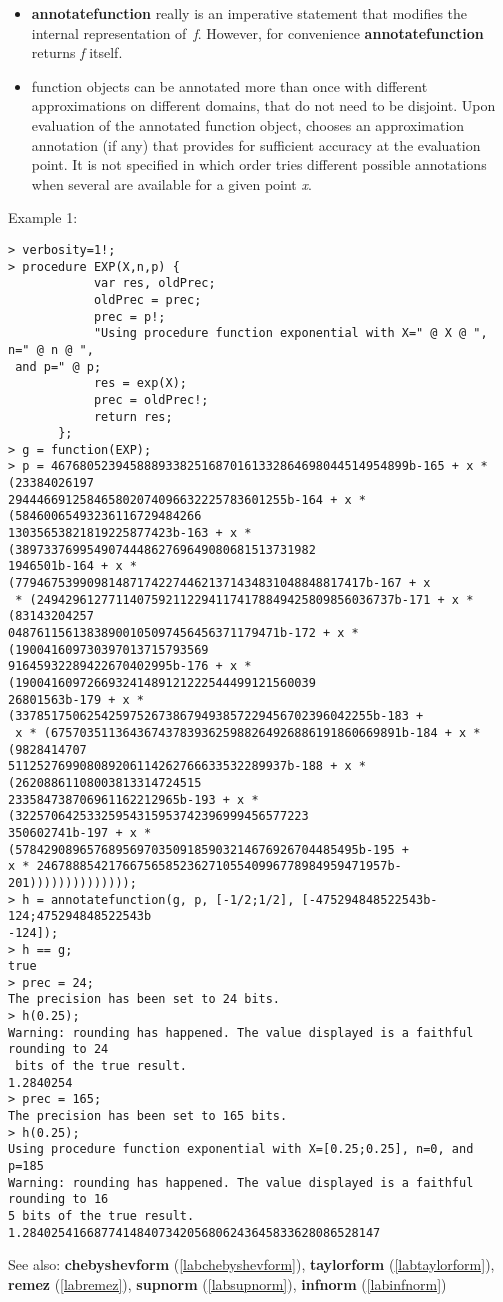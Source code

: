 \begin{itemize}
\item \textbf{annotatefunction} really is an imperative statement that modifies the
   internal representation of~\emph{f}. However, for convenience \textbf{annotatefunction}
   returns \emph{f} itself.

\item \sollya function objects can be annotated more than once with different
   approximations on different domains, that do not need to be disjoint. Upon
   evaluation of the annotated function object, \sollya chooses an
   approximation annotation (if any) that provides for sufficient accuracy at
   the evaluation point. It is not specified in which order \sollya tries
   different possible annotations when several are available for a given
   point \emph{x}.
\end{itemize}
\noindent Example 1: 
\begin{center}\begin{minipage}{15cm}\begin{Verbatim}[frame=single,commandchars=\\\|\~]
> verbosity=1!;
> procedure EXP(X,n,p) {
            var res, oldPrec;
            oldPrec = prec;
            prec = p!;
            "Using procedure function exponential with X=" @ X @ ", n=" @ n @ ",
 and p=" @ p;
            res = exp(X);
            prec = oldPrec!;
            return res;
       };
> g = function(EXP);
> p = 46768052394588893382516870161332864698044514954899b-165 + x * (23384026197
294446691258465802074096632225783601255b-164 + x * (58460065493236116729484266
13035653821819225877423b-163 + x * (389733769954907444862769649080681513731982
1946501b-164 + x * (7794675399098148717422744621371434831048848817417b-167 + x
 * (24942961277114075921122941174178849425809856036737b-171 + x * (83143204257
04876115613838900105097456456371179471b-172 + x * (190041609730397013715793569
91645932289422670402995b-176 + x * (190041609726693241489121222544499121560039
26801563b-179 + x * (33785175062542597526738679493857229456702396042255b-183 +
 x * (6757035113643674378393625988264926886191860669891b-184 + x * (9828414707
511252769908089206114262766633532289937b-188 + x * (26208861108003813314724515
233584738706961162212965b-193 + x * (32257064253325954315953742396999456577223
350602741b-197 + x * (578429089657689569703509185903214676926704485495b-195 + 
x * 2467888542176675658523627105540996778984959471957b-201))))))))))))));
> h = annotatefunction(g, p, [-1/2;1/2], [-475294848522543b-124;475294848522543b
-124]);
> h == g;
true
> prec = 24;
The precision has been set to 24 bits.
> h(0.25);
Warning: rounding has happened. The value displayed is a faithful rounding to 24
 bits of the true result.
1.2840254
> prec = 165;
The precision has been set to 165 bits.
> h(0.25);
Using procedure function exponential with X=[0.25;0.25], n=0, and p=185
Warning: rounding has happened. The value displayed is a faithful rounding to 16
5 bits of the true result.
1.28402541668774148407342056806243645833628086528147
\end{Verbatim}
\end{minipage}\end{center}
See also: \textbf{chebyshevform} (\ref{labchebyshevform}), \textbf{taylorform} (\ref{labtaylorform}), \textbf{remez} (\ref{labremez}), \textbf{supnorm} (\ref{labsupnorm}), \textbf{infnorm} (\ref{labinfnorm})
